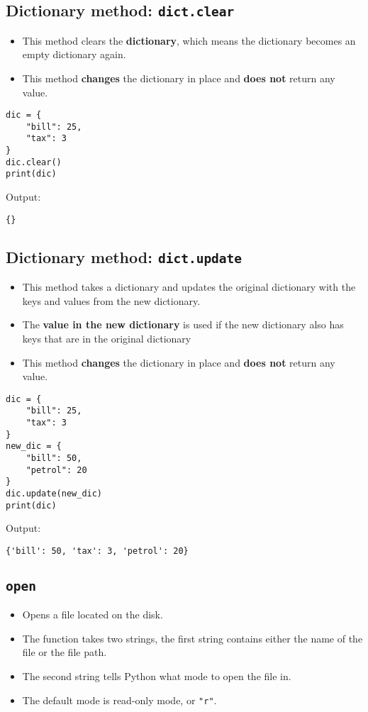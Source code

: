 \documentclass[11pt]{article}
\begin{document}
\subsection{Dictionary method: \texttt{dict.clear}}
\label{sec:orgc209893}
\begin{itemize}
\item This method clears the \textbf{dictionary}, which means the dictionary becomes an empty dictionary again.
\item This method \textbf{changes} the dictionary in place and \textbf{does not} return any value.
\end{itemize}
\begin{verbatim}
dic = {
    "bill": 25,
    "tax": 3
}
dic.clear()
print(dic)
\end{verbatim}

 \noindent Output:

\label{org9a37399}
\begin{verbatim}
{}
\end{verbatim}
\subsection{Dictionary method: \texttt{dict.update}}
\label{sec:orgb59356d}
\begin{itemize}
\item This method takes a dictionary and updates the original dictionary with the keys and values from the new dictionary.
\item The \textbf{value in the new dictionary} is used if the new dictionary also has keys that are in the original dictionary
\item This method \textbf{changes} the dictionary in place and \textbf{does not} return any value.
\end{itemize}
\begin{verbatim}
dic = {
    "bill": 25,
    "tax": 3
}
new_dic = {
    "bill": 50,
    "petrol": 20
}
dic.update(new_dic)
print(dic)
\end{verbatim}

 \noindent Output:

\label{orgf99a2c2}
\begin{verbatim}
{'bill': 50, 'tax': 3, 'petrol': 20}
\end{verbatim}
\subsection{\texttt{open}}
\label{sec:orgbbb7eae}
\begin{itemize}
\item Opens a file located on the disk.
\item The function takes two strings, the first string contains either the name of the file or the file path.
\item The second string tells Python what mode to open the file in.
\item The default mode is read-only mode, or \texttt{"r"}.
\end{itemize}
\end{document}

